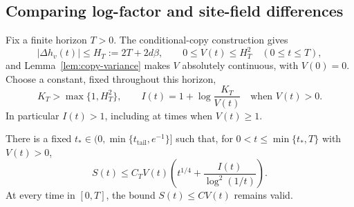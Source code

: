 \subsection{Comparing log-factor and site-field differences}

Fix a finite horizon $T>0$.  The conditional-copy construction gives
\[
 |\Delta h_v(t)|\le H_T:=2T+2d\beta,
 \qquad 0\le V(t)\le H_T^2\quad(0\le t\le T),
\]
and Lemma~\ref{lem:copy-variance} makes $V$ absolutely continuous,
with $V(0)=0$.  Choose a constant, fixed throughout this horizon,
\begin{equation}
 K_T>\max\{1,H_T^2\},\qquad
 I(t)=1+\log\frac{K_T}{V(t)}\quad\text{when }V(t)>0.
 \label{eq:osgood-size}
\end{equation}
In particular $I(t)>1$, including at times when $V(t)\ge1$.

\begin{lemma}
\label{lem:small-log-loss}
There is a fixed $t_*\in(0,\min\{t_{\mathrm{tail}},e^{-1}\}]$ such
that, for $0<t\le\min\{t_*,T\}$ with $V(t)>0$,
\begin{equation}
 S(t)\le C_T V(t)
   \left(t^{1/4}+\frac{I(t)}{\log^2(1/t)}\right).
 \label{eq:small-log-loss}
\end{equation}
At every time in $[0,T]$, the bound $S(t)\le CV(t)$ remains valid.
\end{lemma}

